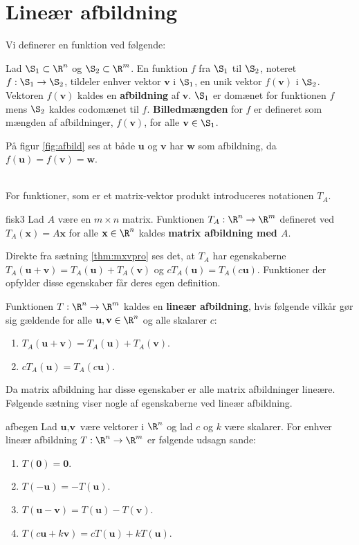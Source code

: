 \section{Lineær afbildning}
%
Vi definerer en funktion ved følgende:
%
\begin{defn}{}{}
Lad $\S _1 \subset \R^n$ og $\S _2 \subset \R^m$.
En funktion $f$ fra $\S_1$ til $\S_2$, noteret $f:\S_1\rightarrow\S_2$, tildeler enhver vektor $\textbf{v}$ i $\S_1$, en unik vektor $f(\textbf{v})$ i $\S_2$.
Vektoren $f(\textbf{v})$ kaldes en \textbf{afbildning} af $\textbf{v}$.
$\S_1$ er domænet for funktionen $f$ mens $\S_2$ kaldes codomænet til $f$.
\textbf{Billedmængden} for $f$ er defineret som mængden af afbildninger, $f(\textbf{v})$, for alle $\textbf{v}\in \S_1$.
\end{defn}\noindent
%
På figur \ref{fig:afbild} ses at både $\textbf{u}$ og $\textbf{v}$ har $\textbf{w}$ som afbildning, da $f(\textbf{u})=f(\textbf{v})=\textbf{w}$.

%
\\
For funktioner, som er et matrix-vektor produkt introduceres notationen $T_A$.
%
\begin{defn}{}{fisk3}
Lad $A$ være en $m \times n$ matrix.
Funktionen $T_A:\R^n \rightarrow \R^m$ defineret ved $T_A(\textbf{x}) = A\textbf{x}$ for alle $\textbf{x} \in \R^n$ kaldes \textbf{matrix afbildning med $A$}.
\end{defn}\noindent
%
Direkte fra sætning \ref{thm:mxvpro} ses det, at $T_A$ har egenskaberne $T_A(\textbf{u}+\textbf{v})=T_A(\textbf{u}) + T_A(\textbf{v})$ og $cT_A(\textbf{u}) = T_A(c\textbf{u})$.
Funktioner der opfylder disse egenskaber får deres egen definition.
%
\begin{defn}{}{}
Funktionen $T: \R^n \rightarrow \R^m$ kaldes en \textbf{lineær afbildning}, hvis følgende vilkår gør sig gældende for alle $\textbf{u},\textbf{v} \in \R^n$ og alle skalarer $c$:
\begin{enumerate}[label=(\alph*)]
\item $T_A(\textbf{u}+\textbf{v})=T_A(\textbf{u}) + T_A(\textbf{v})$.
\item $cT_A(\textbf{u}) = T_A(c\textbf{u})$.
\end{enumerate}
\end{defn}\noindent
%
Da matrix afbildning har disse egenskaber er alle matrix afbildninger lineære.
Følgende sætning viser nogle af egenskaberne ved lineær afbildning.
%
\begin{thm}{}{afbegen}
Lad $\textbf{u}, \textbf{v}$ være vektorer i $\R^n$ og lad $c$ og $k$ være skalarer.
For enhver lineær afbildning $T: \R^n \rightarrow \R^m$ er følgende udsagn sande:
\begin{enumerate}[label = (\alph*)]
\item $T(\textbf{0}) = \textbf{0}$.
\item $T(-\textbf{u}) = -T(\textbf{u})$.
\item $T(\textbf{u}-\textbf{v}) = T(\textbf{u})-T(\textbf{v})$.
\item $T(c\textbf{u} + k\textbf{v}) = cT(\textbf{u}) + kT(\textbf{u})$.
\end{enumerate}
\end{thm}
